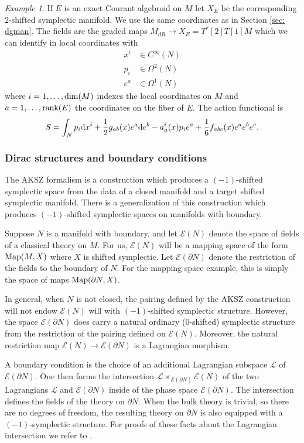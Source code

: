 \documentclass{article}
\newcommand{\cE}{\mathcal{E}}
\def\d{{\rm d}}
\theoremstyle{definition}
\theoremstyle{remark}
\newtheorem{Ex}[theorem]{Example}
\begin{document}
\begin{Ex} \label{ex: exact CA}
If $E$ is an exact Courant algebroid on $M$ let $X_E$ be the corresponding $2$-shifted symplectic manifold.
We use the same coordinates as in Section \ref{sec: dgman}.
The fields are the graded maps $M_{dR} \to X_E = T^*[2] T[1] M$ which we can identify in local coordinates with
\begin{align*}
x^i &\in C^\infty(N) \\
p_i & \in \Omega^2(N) \\
e^a & \in \Omega^1(N) 
\end{align*}
where $i = 1,\ldots, {\rm dim}(M)$ indexes the local coordinates on $M$ and $a = 1, \ldots, {\rm rank}(E)$ the coordinates on the fiber of $E$.
The action functional is
\[
S = \int_N p_i \d x^i + \frac{1}{2} g_{ab}(x) e^a \d e^b - a_a^i(x) p_i e^a + \frac{1}{6} f_{abc} (x) e^{a} e^b e^c .
\]
\end{Ex}

\subsubsection{Dirac structures and boundary conditions}

The AKSZ formalism is a construction which produces a $(-1)$-shifted symplectic space from the data of a closed manifold and a target shifted symplectic manifold. 
There is a generalization of this construction which produces $(-1)$-shifted symplectic spaces on manifolds with boundary. 

Suppose $N$ is a manifold with boundary, and let $\cE(N)$ denote the space of fields of a classical theory on $M$. 
For us, $\cE(N)$ will be a mapping space of the form ${\rm Map}(M, X)$ where $X$ is shifted symplectic. 
Let $\cE(\partial N)$ denote the restriction of the fields to the boundary of $N$. 
For the mapping space example, this is simply the space of maps ${\rm Map}(\partial N, X)$.

In general, when $N$ is not closed, the pairing defined by the AKSZ construction will not endow $\cE(N)$ will with $(-1)$-shifted symplectic structure. 
However, the space $\cE(\partial N)$ does carry a natural ordinary ($0$-shifted) symplectic structure from the restriction of the pairing defined on $\cE(N)$. 
Moreover, the natural restriction map $\cE(N) \to \cE(\partial N)$ is a Lagrangian morphism.

\def\cL{\mathcal{L}}

A boundary condition is the choice of an additional Lagrangian subspace $\cL$ of $\cE(\partial N)$.
One then forms the intersection $\cL \times_{\cE(\partial N)} \cE(N)$ of the two Lagrangians $\cL$ and $\cE(\partial N)$ inside of the phase space $\cE(\partial N)$. 
The intersection defines the fields of the theory on $\partial N$. 
When the bulk theory is trivial, so there are no degrees of freedom, the resulting theory on $\partial N$ is also equipped with a $(-1)$-symplectic structure. 
For proofs of these facts about the Lagrangian intersection we refer to \cite{Calaque,PTVV}.
\end{document}
